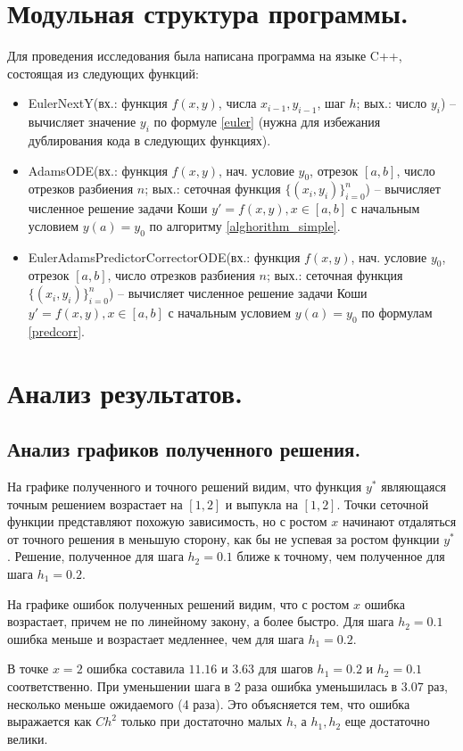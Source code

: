 \documentclass[a4paper, 12pt]{article}
\begin{document}
	\section{Модульная структура программы.}
	Для проведения исследования была написана программа на языке C++, состоящая из следующих функций:
	\begin{itemize}
		\item EulerNextY(вх.: функция $f(x,y)$, числа $x_{i-1},y_{i-1}$, шаг $h$; вых.: число $y_i$) -- вычисляет значение $y_i$ по формуле \eqref{euler} (нужна для избежания дублирования кода в следующих функциях).
		\item AdamsODE(вх.: функция $f(x,y)$, нач. условие $y_0$, отрезок $[a,b]$, число отрезков разбиения $n$; вых.: сеточная функция $\{(x_i,y_i)\}_{i=0}^n$) -- вычисляет численное решение задачи Коши $y'=f(x,y),x\in[a,b]$ с начальным условием $y(a)=y_0$ по алгоритму \ref{alghorithm_simple}.
		\item EulerAdamsPredictorCorrectorODE(вх.: функция $f(x,y)$, нач. условие $y_0$, отрезок $[a,b]$, число отрезков разбиения $n$; вых.: сеточная функция $\{(x_i,y_i)\}_{i=0}^n$) -- вычисляет численное решение задачи Коши $y'=f(x,y),x\in[a,b]$ с начальным условием $y(a)=y_0$ по формулам \eqref{predcorr}.
	\end{itemize}
	
	\section{Анализ результатов.}
	
	\subsection{Анализ графиков полученного решения.} \label{ans_analytics}
	
	На графике полученного и точного решений видим, что функция $y^*$ являющаяся точным решением возрастает на $[1,2]$ и выпукла на $[1,2]$. Точки сеточной функции представляют похожую зависимость, но с ростом $x$ начинают отдаляться от точного решения в меньшую сторону, как бы не успевая за ростом функции $y^*$. Решение, полученное для шага $h_2=0.1$ ближе к точному, чем полученное для шага $h_1=0.2$.
	
	На графике ошибок полученных решений видим, что с ростом $x$ ошибка возрастает, причем не по линейному закону, а более быстро. Для шага $h_2=0.1$ ошибка меньше и возрастает медленнее, чем для шага $h_1=0.2$. 
	
	В точке $x=2$ ошибка составила $11.16$ и $3.63$ для шагов $h_1=0.2$ и $h_2=0.1$ соответственно. При уменьшении шага в 2 раза ошибка уменьшилась в $3.07$ раз, несколько меньше ожидаемого (4 раза). Это объясняется тем, что ошибка выражается как $Ch^2$ только при достаточно малых $h$, а $h_1,h_2$ еще достаточно велики.
	
\end{document}
